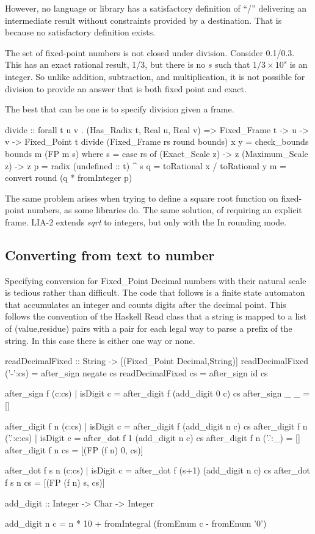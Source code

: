 \documentclass{article}
\begin{document}
However, no language or library has a satisfactory definition of
``/'' delivering an intermediate result without constraints
provided by a destination.  That is because no satisfactory
definition exists.

The set of fixed-point numbers is not closed under division.
Consider 0.1/0.3.  This has an exact rational result, 1/3,
but there is no $s$ such that $1/3 \times 10^s$ is an integer.
So unlike addition, subtraction, and multiplication, it is not
possible for division to provide an answer that is both fixed
point and exact.

The best that can be one is to specify division given a frame.

\begin{code}
divide :: forall t u v . (Has_Radix t, Real u, Real v) =>
          Fixed_Frame t -> u -> v -> Fixed_Point t
divide (Fixed_Frame rs round bounds) x y
  = check_bounds bounds m (FP m s)
  where
    s = case rs of
          (Exact_Scale   z) -> z
          (Maximum_Scale z) -> z
    p = radix (undefined :: t) ^ s
    q = toRational x / toRational y
    m = convert round (q * fromInteger p)
\end{code}

The same problem arises when trying to define a square root
function on fixed-point numbers, as some libraries do.  The
same solution, of requiring an explicit frame.  LIA-2 extends
{\it sqrt} to integers, but only with the In rounding mode.

\subsection{Converting from text to number}

Specifying conversion for Fixed\_Point Decimal numbers
with their natural scale is tedious rather than difficult.
The code that follows is a finite state automaton that
accumulates an integer and counts digits after the decimal point.
This follows the convention of the Haskell Read class that
a string is mapped to a list of (value,residue) pairs with a
pair for each legal way to parse a prefix of the string.  In
this case there is either one way or none.

\begin{code}
readDecimalFixed :: String -> [(Fixed_Point Decimal,String)]
readDecimalFixed ('-':cs) = after_sign negate cs
readDecimalFixed cs       = after_sign id     cs

after_sign f (c:cs)
  | isDigit c = after_digit f (add_digit 0 c) cs
after_sign _ _ = []

after_digit f n (c:cs)
  | isDigit c = after_digit f (add_digit n c) cs
after_digit f n ('.':c:cs)
  | isDigit c = after_dot f 1 (add_digit n c) cs
after_digit f n ('.':_) = []
after_digit f n cs = [(FP (f n) 0, cs)]

after_dot f s n (c:cs)
  | isDigit c = after_dot f (s+1) (add_digit n c) cs
after_dot f s n cs = [(FP (f n) s, cs)]

add_digit :: Integer -> Char -> Integer

add_digit n c =
   n * 10 + fromIntegral (fromEnum c - fromEnum '0')
\end{code}
\end{document}
